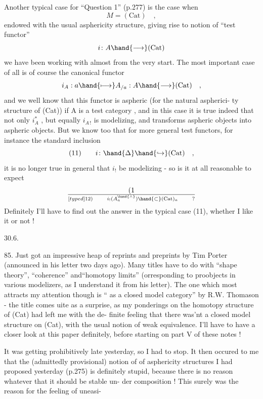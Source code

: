 
Another typical case for ``Question 1'' (p.277) is the case when
\[ M = (\mathrm{Cat}) \quad , \]
endowed with the usual asphericity structure, giving rise to  notion of
``test functor''
\[ i\colon A \hand{\longrightarrow} (\mathrm{Cat}) \]
we have been working with almost from the very start. The most important
case of all is of course the canonical functor
\[ i_A : a \hand{\longmapsto} A_{/a} : A \hand{\longrightarrow} (\mathrm{Cat}) \quad , \]
and we well know that this functor is aspheric (for the natural aspherici-%
ty structure of (Cat)) if A is a  test category , and in this case it
is true indeed that not only $i_A^{*}$ , but equally $i_{A\,!}$ is modelizing, and
transforms aspheric objects into aspheric objects. But we know too that
for more general test functors, for instance the standard inclusion
\[ (11) \qquad i\colon \hand{\Delta} \hand{\hookrightarrow} (\mathrm{Cat}) \quad , \]
it is no longer true in general that $i_!$ be modelizing - so is it at all
reasonable to expect
\[ (1\over[typed]{1}{2}) \qquad i_!(A^{\hand{\wedge}}_a) \hand{\subset} (\mathrm{Cat})_a \qquad ? \]
Definitely I'll have to find out the answer in the typical case (11),
whether I like it or not !


30.6.

85. Just got an impressive heap of reprints and preprints by Tim
Porter (announced in his letter two days ago). Many titles have to do
with ``shape theory'', ``coherence'' and``homotopy limits'' (orresponding to
proobjects in various modelizers, as I understand it from his letter).
The one which most attracts my attention though is ``\hand{\uline{\textcolor{black}{Cat}}} as a closed model
category'' by R.W. Thomason - the title comes uite as a surprise, as
my ponderings on the homotopy structure of (Cat) had left me with the de-%
finite feeling that there was'nt a closed model structure on (Cat), with
the usual notion of weak equivalence. I'll have to  have a closer
\margin{$\times$} look at this paper definitely, before starting on part V of these notes !

It was getting prohibitively late yesterday, so I had to stop. It
then occured to me that the (admittedly provisional) notion of \hand{\uline{\textcolor{black}{morphism}}}
of asphericity structures I had proposed yesterday (p.275) is definitely
stupid, because there is no reason whatever that it should be stable un-%
der composition ! This surely was the reason for the feeling of uneasi-%

